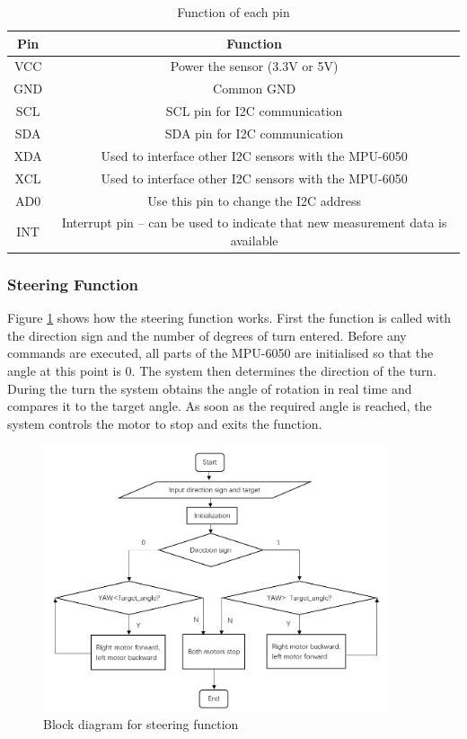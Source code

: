 \documentclass[12pt, a4paper, oneside]{report}
\begin{document}
\begin{table}[H]
    \centering 
    \begin{tabular}{|c|c|}
        \hline
        \textbf{Pin} & \textbf{Function} \\ \hline
        VCC & Power the sensor (3.3V or 5V) \\ \hline
        GND & Common GND \\ \hline
        SCL & SCL pin for I2C communication \\ \hline
        SDA & SDA pin for I2C communication \\ \hline
        XDA & Used to interface other I2C sensors with the MPU-6050 \\ \hline
        XCL & Used to interface other I2C sensors with the MPU-6050 \\ \hline
        AD0 & Use this pin to change the I2C address \\ \hline
        INT & Interrupt pin – can be used to indicate that new measurement data is available \\ \hline
    \end{tabular}
    \caption{Function of each pin}
    \label{tab:mp1}
\end{table}

\subsubsection{Steering Function}
Figure \ref{fig:mp4} shows how the steering function works. First the function is called with the direction sign and the number of degrees of turn entered. Before any commands are executed, all parts of the MPU-6050 are initialised so that the angle at this point is 0. The system then determines the direction of the turn. During the turn the system obtains the angle of rotation in real time and compares it to the target angle. As soon as the required angle is reached, the system controls the motor to stop and exits the function.

\begin{figure}[H]
  \centering
  \includegraphics[width=0.9\textwidth]{pic/Navigation/8.png}
  \caption{Block diagram for steering function}
  \label{fig:mp4}
\end{figure}
\end{document}
